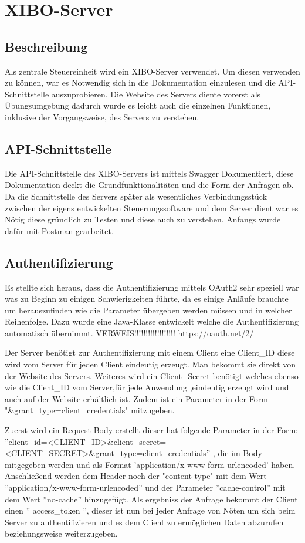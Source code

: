 \chapter{XIBO-Server}
\section{Beschreibung}
Als zentrale Steuereinheit wird ein XIBO-Server verwendet. Um diesen verwenden zu können, war es Notwendig sich in die Dokumentation einzulesen und die API-Schnittstelle auszuprobieren. Die Website des Servers diente vorerst als Übungsumgebung dadurch wurde es leicht auch die einzelnen Funktionen, inklusive der Vorgangsweise, des Servers zu verstehen.

\section{API-Schnittstelle}
Die API-Schnittstelle des XIBO-Servers ist mittels Swagger Dokumentiert, diese Dokumentation deckt die Grundfunktionalitäten und die Form der Anfragen ab. Da die Schnittstelle des Servers später als wesentliches Verbindungsstück zwischen der eigens entwickelten Steuerungssoftware und dem Server dient war es Nötig diese gründlich zu Testen und diese auch zu verstehen. Anfangs wurde dafür mit Postman gearbeitet. 


\section{Authentifizierung}
Es stellte sich heraus, dass die Authentifizierung mittels OAuth2 sehr speziell war was zu Beginn zu einigen Schwierigkeiten führte, da es einige Anläufe brauchte um herauszufinden wie die Parameter übergeben werden müssen und in welcher Reihenfolge. Dazu wurde eine Java-Klasse entwickelt welche die Authentifizierung automatisch übernimmt.
VERWEIS!!!!!!!!!!!!!!!!!!
https://oauth.net/2/

Der Server benötigt zur Authentifizierung mit einem Client eine Client_ID diese wird vom Server für jeden Client eindeutig erzeugt. Man bekommt sie direkt von der Website des Servers. 
Weiteres wird ein Client_Secret benötigt welches ebenso wie die Client_ID vom Server,für jede Anwendung ,eindeutig erzeugt wird und auch auf der Website erhältlich ist. Zudem ist ein Parameter in der Form "&grant_type=client_credentials" mitzugeben.

Zuerst wird ein Request-Body erstellt dieser hat folgende Parameter in der Form: 
 ''client\_id=<CLIENT\_ID>\&client\_secret=<CLIENT\_SECRET>\&grant\_type=client\_credentials''
, die im Body mitgegeben werden und als Format 'application/x-www-form-urlencoded'  haben. Anschließend werden dem Header noch der "content-type" mit dem Wert ''application/x-www-form-urlencoded'' und der Parameter ''cache-control'' mit dem Wert ''no-cache'' hinzugefügt. Als ergebniss der Anfrage bekommt der Client einen '' access\_token '', dieser ist nun bei jeder Anfrage von Nöten um sich beim Server zu authentifizieren und es dem Client zu ermöglichen Daten abzurufen beziehungsweise weiterzugeben.

